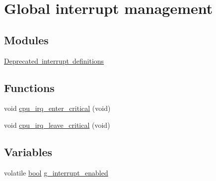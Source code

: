 \hypertarget{group__interrupt__group}{}\section{Global interrupt management}
\label{group__interrupt__group}
\subsection*{Modules}
\begin{DoxyCompactItemize}
\item 
\mbox{\hyperlink{group__interrupt__deprecated__group}{Deprecated interrupt definitions}}
\end{DoxyCompactItemize}
\subsection*{Functions}
\begin{DoxyCompactItemize}
\item 
void \mbox{\hyperlink{group__interrupt__group_ga2b5f1a58b98aea52fbe094636054d910}{cpu\+\_\+irq\+\_\+enter\+\_\+critical}} (void)
\item 
void \mbox{\hyperlink{group__interrupt__group_gad9a7e953e4e3eb6bde58eb1c81092b43}{cpu\+\_\+irq\+\_\+leave\+\_\+critical}} (void)
\end{DoxyCompactItemize}
\subsection*{Variables}
\begin{DoxyCompactItemize}
\item 
volatile \mbox{\hyperlink{group__group__sam0__utils_ga97a80ca1602ebf2303258971a2c938e2}{bool}} \mbox{\hyperlink{group__interrupt__group_ga18a272af1cdb2009183461e1647f4e86}{g\+\_\+interrupt\+\_\+enabled}}
\end{DoxyCompactItemize}
